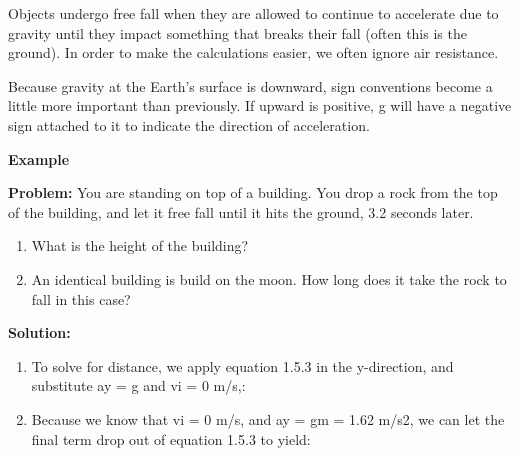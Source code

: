 Objects undergo free fall when they are allowed to continue to accelerate due to gravity until they impact something that breaks their fall (often this is the ground).  In order to make the calculations easier, we often ignore air resistance.

Because gravity at the Earth's surface is downward, sign conventions become a little more important than previously.  If upward is positive, g will have a negative sign attached to it to indicate the direction of acceleration.  


\begin{mdframed}[backgroundcolor=blue!10!white]
	\begin{center}
		
		
		\textbf{Example \thesection}	
	\end{center}
	\vspace{0.1in}
	
	\textbf{Problem: } You are standing on top of a building.  You drop a rock  from the top of the building, and let it free fall until it hits the ground, 3.2 seconds later.  
	\begin{enumerate}[label=\alph*.]
		\item What is the height of the building?
		\item An identical building is build on the moon.  How long does it take the rock to fall in this case?
	\end{enumerate}

	\textbf{Solution:}
	\begin{enumerate}[label=\alph*.]
		\item To solve for distance, we apply equation 1.5.3 in the y-direction, and substitute ay = g and vi = 0 m/s,:
		
		\item Because we know that vi = 0 m/s, and ay = gm = 1.62 m/s2, we can let the final term drop out of equation 1.5.3 to yield:
	\end{enumerate}
\end{mdframed}




